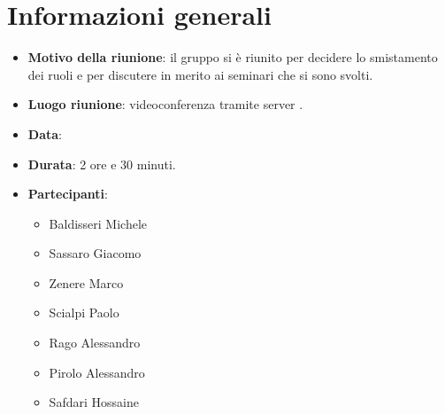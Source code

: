 \section{Informazioni generali}
\begin{itemize}
\item \textbf{Motivo della riunione}: il gruppo si è riunito per decidere lo smistamento dei ruoli e per discutere in merito ai seminari che si sono svolti.
\item \textbf{Luogo riunione}: videoconferenza tramite server .
\item \textbf{Data}: \Data{}
\item \textbf{Durata}: 2 ore e 30 minuti.
\item \textbf{Partecipanti}:
	\begin{itemize}
	\item Baldisseri Michele
	\item Sassaro Giacomo
	\item Zenere Marco
	\item Scialpi Paolo
	\item Rago Alessandro
	\item Pirolo Alessandro
	\item Safdari Hossaine
	\end{itemize}
\end{itemize}
\newpage
